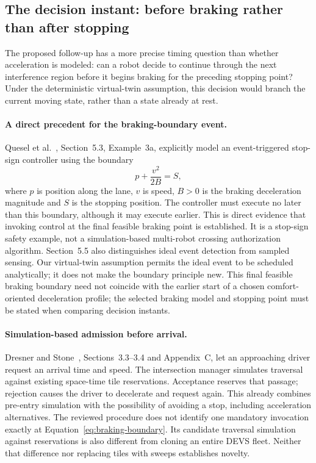 \documentclass[11pt,a4paper]{article}
\theoremstyle{remark}
\newcounter{algorithm}
\begin{document}
\subsection{The decision instant: before braking rather than after stopping}
\label{sec:prebraking-review}
The proposed follow-up has a more precise timing question than whether
acceleration is modeled: can a robot decide to continue through the next
interference region before it begins braking for the preceding stopping point?
Under the deterministic virtual-twin assumption, this decision would branch
the current moving state, rather than a state already at rest.

\paragraph{A direct precedent for the braking-boundary event.}
Quesel et al.~\cite{quesel2016}, Section~5.3, Example~3a, explicitly model
an event-triggered stop-sign controller using the boundary
\begin{equation}
 p+\frac{v^2}{2B}=S,
 \label{eq:braking-boundary}
\end{equation}
where $p$ is position along the lane, $v$ is speed, $B>0$ is the braking
deceleration magnitude and $S$ is the stopping position. The controller
must execute no later than this boundary, although it may execute earlier.
This is direct evidence that invoking control at the final feasible braking
point is established. It is a stop-sign safety example, not a simulation-based
multi-robot crossing authorization algorithm. Section~5.5 also distinguishes
ideal event detection from sampled sensing. Our virtual-twin assumption
permits the ideal event to be scheduled analytically; it does not make the
boundary principle new.
This final feasible braking boundary need not coincide with the earlier
start of a chosen comfort-oriented deceleration profile; the selected braking
model and stopping point must be stated when comparing decision instants.

\paragraph{Simulation-based admission before arrival.}
Dresner and Stone~\cite{dresner2008}, Sections~3.3--3.4 and Appendix~C,
let an approaching driver request an arrival time and speed. The intersection
manager simulates traversal against existing space-time tile reservations.
Acceptance reserves that passage; rejection causes the driver to decelerate
and request again. This already combines pre-entry simulation with the
possibility of avoiding a stop, including acceleration alternatives.
The reviewed procedure does not identify one mandatory invocation exactly
at Equation~\eqref{eq:braking-boundary}. Its candidate traversal simulation
against reservations is also different from cloning an entire DEVS fleet.
Neither that difference nor replacing tiles with sweeps establishes novelty.
\end{document}

